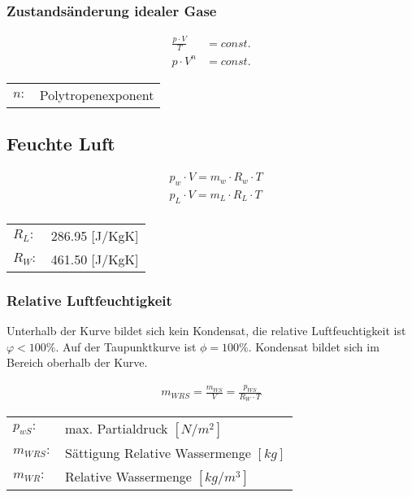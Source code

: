 \subsubsection{Zustandsänderung idealer Gase}
\begin{align*}
\frac{p \cdot V}{T} &= const. \\
p \cdot V^n &= const.
\end{align*}
\begin{tabular}{ll}
$n:$ & Polytropenexponent
\end{tabular}


\subsection{Feuchte Luft}
\begin{align*}
&p_w \cdot V = m_w \cdot R_w \cdot T  \\
&p_L \cdot V = m_L \cdot R_L \cdot T  \\
\end{align*}

\begin{tabular}{ll}
$R_L:$ & 286.95 [J/KgK] \\
$R_W:$ & 461.50 [J/KgK] 
\end{tabular}


\subsubsection{Relative Luftfeuchtigkeit}
Unterhalb der Kurve bildet sich kein Kondensat, die relative Luftfeuchtigkeit ist $ \varphi < 100 \%$. 
Auf der Taupunktkurve ist  $\phi = 100 \%$. Kondensat bildet sich im Bereich oberhalb der Kurve. 

\begin{align*}
m_{WRS} = \frac{m_{WS}}{V} = \frac{p_{WS}}{R_W \cdot T}
\end{align*}

\begin{tabular}{ll}
$p_{wS}:$ & max. Partialdruck $[N/m^2]$ \\
$m_{WRS}:$ & Sättigung Relative Wassermenge $[kg]$ \\
$m_{WR}:$ & Relative Wassermenge $[kg/m^3]$
\end{tabular}

